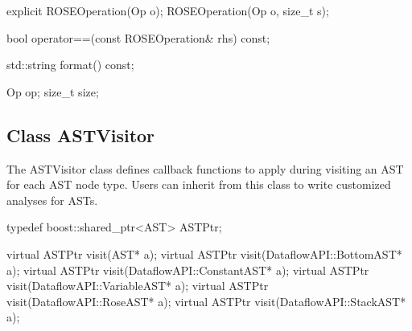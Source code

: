 \begin{apient}
explicit ROSEOperation(Op o);
ROSEOperation(Op o, size_t s);
\end{apient}

\begin{apient}
bool operator==(const ROSEOperation& rhs) const;
\end{apient}

\begin{apient}
std::string format() const;
\end{apient}

\begin{apient}
Op op;
size_t size;
\end{apient}

\subsection{Class ASTVisitor}


The ASTVisitor class defines callback functions to apply during visiting an AST for
each AST node type. Users can inherit from this class to write customized analyses
for ASTs.

\begin{apient}
typedef boost::shared_ptr<AST> ASTPtr;

virtual ASTPtr visit(AST* a);
virtual ASTPtr visit(DataflowAPI::BottomAST* a);
virtual ASTPtr visit(DataflowAPI::ConstantAST* a);
virtual ASTPtr visit(DataflowAPI::VariableAST* a);
virtual ASTPtr visit(DataflowAPI::RoseAST* a);
virtual ASTPtr visit(DataflowAPI::StackAST* a);
\end{apient}


